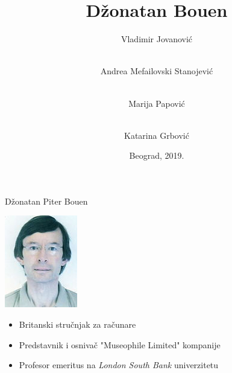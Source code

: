\documentclass{beamer}
\begin{document}
\title{Džonatan Bouen}
\author{\flushleft Vladimir Jovanović \and\\ Andrea Mefailovski Stanojević \and\\ Marija Papović \and\\ Katarina Grbović }
\date{\footnotesize{Beograd, 2019.}}

\begin{frame}
	\thispagestyle{empty}
	\titlepage
\end{frame}

\addtocounter{framenumber}{-1}

\begin{frame}{Džonatan Piter Bouen}
    \begin{center} \includegraphics[scale=3]{Jonathan_Bowen_photograph.jpg} \end{center}
    \begin{itemize}
        \item{ Britanski stručnjak za računare }
        \item{ Predstavnik i osnivač "Museophile Limited" kompanije }
        \item{ Profesor emeritus na \textit{London South Bank} univerzitetu }
    \end{itemize}
\end{frame}
\end{document}
